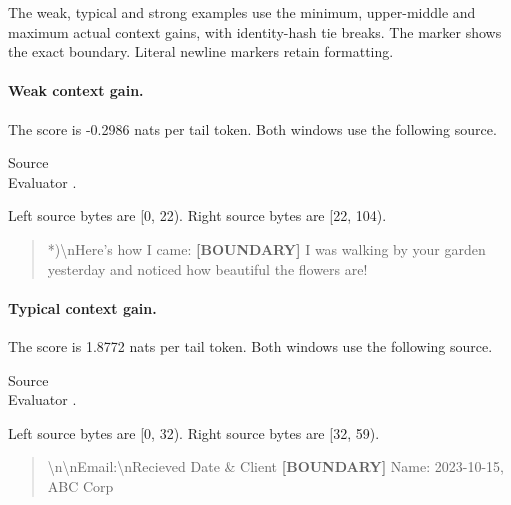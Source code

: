 The weak, typical and strong examples use the minimum, upper-middle and maximum actual context gains, with identity-hash tie breaks. The marker shows the exact boundary. Literal newline markers retain formatting.

\noindent\begin{minipage}{\linewidth}

\paragraph{Weak context gain.}

The score is -0.2986 nats per tail token. Both windows use the following source.

\begin{flushleft}\small Source \\ Evaluator .\end{flushleft}

Left source bytes are [0, 22). Right source bytes are [22, 104).

\begin{quote}\small **)\textbackslash{}nHere's how I came:\textbf{ [BOUNDARY] } I was walking by your garden yesterday and noticed how beautiful the flowers are!\end{quote}

\end{minipage}\par\medskip

\noindent\begin{minipage}{\linewidth}

\paragraph{Typical context gain.}

The score is 1.8772 nats per tail token. Both windows use the following source.

\begin{flushleft}\small Source \\ Evaluator .\end{flushleft}

Left source bytes are [0, 32). Right source bytes are [32, 59).

\begin{quote}\small  \textbackslash{}n\textbackslash{}nEmail:\textbackslash{}nRecieved Date \& Client\textbf{ [BOUNDARY] } Name: 2023-10-15, ABC Corp\end{quote}

\end{minipage}\par\medskip


